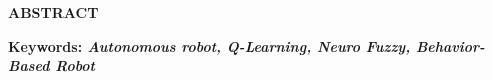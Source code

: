 \chapter*{}
\vspace*{-1.0cm}
\begin{center}
\normalfont\LARGE\textbf{ABSTRACT}
\end{center}

\textbf{Keywords: \textit{Autonomous robot, Q-Learning, Neuro Fuzzy, Behavior-Based Robot}}